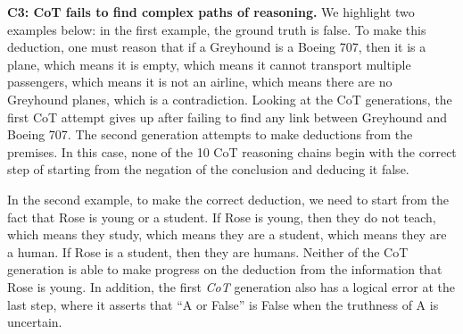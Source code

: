 \textbf{C3: CoT fails to find complex paths of reasoning.} We highlight two examples below: in the first example, the ground truth is false. To make this deduction, one must reason that if a Greyhound is a Boeing 707, then it is a plane, which means it is empty, which means it cannot transport multiple passengers, which means it is not an airline, which means there are no Greyhound planes, which is a contradiction. Looking at the CoT generations, the first CoT attempt gives up after failing to find any link between Greyhound and Boeing 707. The second generation attempts to make deductions from the premises. In this case, none of the 10 CoT reasoning chains begin with the correct step of starting from the negation of the conclusion and deducing it false.

In the second example, to make the correct deduction, we need to start from the fact that Rose is young or a student. If Rose is young, then they do not teach, which means they study, which means they are a student, which means they are a human. If Rose is a student, then they are humans. Neither of the CoT generation is able to make progress on the deduction from the information that Rose is young. In addition, the first \textit{CoT} generation also has a logical error at the last step, where it asserts that ``A or False'' is False when the truthness of A is uncertain.
